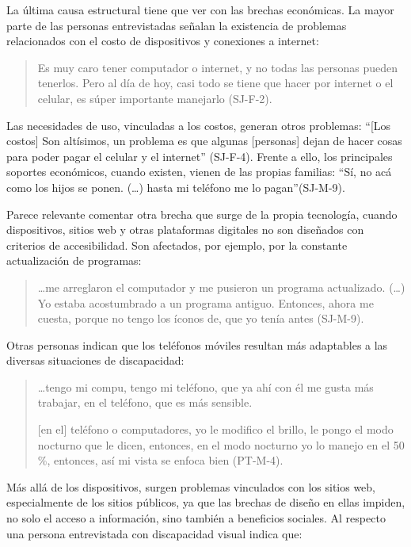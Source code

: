 La última causa estructural tiene que ver con las brechas económicas. La
mayor parte de las personas entrevistadas señalan la existencia de
problemas relacionados con el costo de dispositivos y conexiones a
internet:

\begin{quote}
	Es muy caro tener computador o internet, y no todas las personas pueden
	tenerlos. Pero al día de hoy, casi todo se tiene que hacer por internet
	o el celular, es súper importante manejarlo (SJ-F-2).
\end{quote}

Las necesidades de uso, vinculadas a los costos, generan otros
problemas: \enquote{{[}Los costos{]} Son altísimos, un problema es que algunas
	{[}personas{]} dejan de hacer cosas para poder pagar el celular y el
	internet} (SJ-F-4). Frente a ello, los principales soportes económicos,
cuando existen, vienen de las propias familias: \enquote{Sí, no acá como los
	hijos se ponen. (\ldots) hasta mi teléfono me lo pagan}(SJ-M-9).
		
		Parece relevante comentar otra brecha que surge de la propia tecnología,
		cuando dispositivos, sitios web y otras plataformas digitales no son
		diseñados con criterios de accesibilidad. Son afectados, por ejemplo,
		por la constante actualización de programas:
		
		\begin{quote}
			\ldots me arreglaron el computador y me pusieron un programa actualizado.
			(\ldots) Yo estaba acostumbrado a un programa antiguo. Entonces, ahora
			me cuesta, porque no tengo los íconos de, que yo tenía antes (SJ-M-9).
		\end{quote}
		
		Otras personas indican que los teléfonos móviles resultan más adaptables
		a las diversas situaciones de discapacidad:
		
		\begin{quote}
			\ldots tengo mi compu, tengo mi teléfono, que ya ahí con él me gusta más
			trabajar, en el teléfono, que es más sensible.
			
			{[}en el{]} teléfono o computadores, yo le modifico el brillo, le pongo
			el modo nocturno que le dicen, entonces, en el modo nocturno yo lo
			manejo en el 50 \%, entonces, así mi vista se enfoca bien (PT-M-4).
		\end{quote}
		
		Más allá de los dispositivos, surgen problemas vinculados con los sitios
		web, especialmente de los sitios públicos, ya que las brechas de diseño
		en ellas impiden, no solo el acceso a información, sino también a
		beneficios sociales. Al respecto una persona entrevistada con
		discapacidad visual indica que:
		
